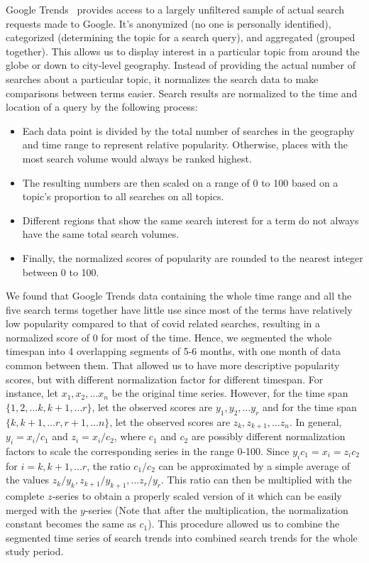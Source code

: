 \documentclass[11pt, a4paper]{article}
\begin{document}
Google Trends~\cite{google-trends} provides access to a largely unfiltered sample of actual search requests made to Google. It’s anonymized (no one is personally identified), categorized (determining the topic for a search query), and aggregated (grouped together). This allows us to display interest in a particular topic from around the globe or down to city-level geography. Instead of providing the actual number of searches about a particular topic, it normalizes the search data to make comparisons between terms easier. Search results are normalized to the time and location of a query by the following process:

\begin{itemize}
    \item Each data point is divided by the total number of searches in the geography and time range to represent relative popularity. Otherwise, places with the most search volume would always be ranked highest.
    \item The resulting numbers are then scaled on a range of 0 to 100 based on a topic's proportion to all searches on all topics.
    \item Different regions that show the same search interest for a term do not always have the same total search volumes.
    \item Finally, the normalized scores of popularity are rounded to the nearest integer between 0 to 100.
\end{itemize}

We found that Google Trends data containing the whole time range and all the five search terms together have little use since most of the terms have relatively low popularity compared to that of covid related searches, resulting in a normalized score of 0 for most of the time. Hence, we segmented the whole timespan into 4 overlapping segments of 5-6 months, with one month of data common between them. That allowed us to have more descriptive popularity scores, but with different normalization factor for different timespan. For instance, let $x_1, x_2, \dots x_n$ be the original time series. However, for the time span $\{ 1, 2, \dots k, k+1, \dots r \}$, let the observed scores are $y_1, y_2, \dots y_r$ and for the time span $\{ k, k+1, \dots r, r+1, \dots n \}$, let the observed scores are $z_k, z_{k+1}, \dots z_n$. In general, $y_i = x_i / c_1$ and $z_i = x_i / c_2$, where $c_1$ and $c_2$ are possibly different normalization factors to scale the corresponding series in the range 0-100. Since $y_i c_1 = x_i = z_i c_2$ for $i = k, k+1, \dots r$, the ratio $c_1/c_2$ can be approximated by a simple average of the values $z_k/y_k, z_{k+1}/y_{k+1}, \dots z_r/y_r$. This ratio can then be multiplied with the complete $z$-series to obtain a properly scaled version of it which can be easily merged with the $y$-series (Note that after the multiplication, the normalization constant becomes the same as $c_1$). This procedure allowed us to combine the segmented time series of search trends into combined search trends for the whole study period.
\end{document}
